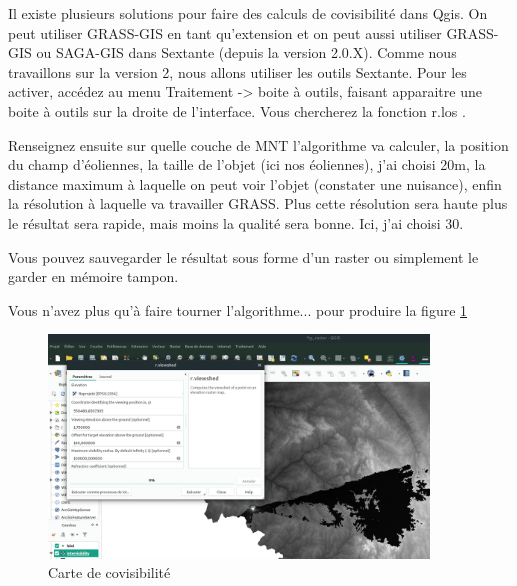 \documentclass[a4paper, 11pt]{article}
\begin{document}
    Il existe plusieurs solutions pour faire des calculs de covisibilité dans Qgis. On peut utiliser GRASS-GIS en tant qu'extension et on peut aussi utiliser GRASS-GIS ou SAGA-GIS dans Sextante (depuis la version 2.0.X). Comme nous travaillons sur la version 2, nous allons utiliser les outils Sextante. Pour les activer, accédez au menu Traitement -> boite à outils, faisant apparaitre une boite à outils sur la droite de l'interface. Vous chercherez la fonction r.los .

    Renseignez ensuite sur quelle couche de MNT l'algorithme va calculer,  la position du champ d'éoliennes, la taille de l'objet (ici nos éoliennes), j'ai choisi 20m, la distance maximum à laquelle on peut voir l'objet (constater une nuisance), enfin la résolution à laquelle va travailler GRASS. Plus cette résolution sera haute plus le résultat sera rapide, mais moins la qualité sera bonne. Ici, j'ai choisi 30.

    Vous pouvez sauvegarder le résultat sous forme d'un raster ou simplement le garder en mémoire tampon.

    Vous n'avez plus qu'à faire tourner l'algorithme... pour produire la figure \ref{fig:carte_limousin_covisibilite}

    \begin{figure}
    \centering
    \includegraphics[width=0.9\textwidth]{img/r.viewshed}
      \caption{Carte de covisibilité}\label{fig:carte_limousin_covisibilite}
    \end{figure}
\end{document}
